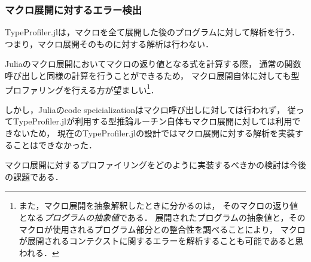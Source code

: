 \subsubsection{マクロ展開に対するエラー検出}

TypeProfiler.jlは，マクロを全て展開した後のプログラムに対して解析を行う．
つまり，マクロ展開そのものに対する解析は行わない．

Juliaのマクロ展開においてマクロの返り値となる式を計算する際，
通常の関数呼び出しと同様の計算を行うことができるため，
マクロ展開自体に対しても型プロファリングを行える方が望ましい\footnote{
  また，マクロ展開を抽象解釈したときに分かるのは，
  そのマクロの返り値となる\textit{プログラムの抽象値}である．
  展開されたプログラムの抽象値と，そのマクロが使用されるプログラム部分との整合性を調べることにより，
  マクロが展開されるコンテクストに関するエラーを解析することも可能であると思われる．
}．

しかし，Juliaのcode speicializationはマクロ呼び出しに対しては行われず，
従ってTypeProfiler.jlが利用する型推論ルーチン自体もマクロ展開に対しては利用できないため，
現在のTypeProfiler.jlの設計ではマクロ展開に対する解析を実装することはできなかった．

マクロ展開に対するプロファイリングをどのように実装するべきかの検討は今後の課題である．
